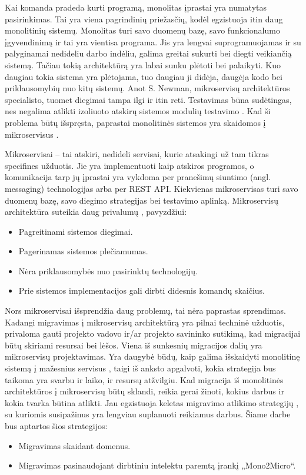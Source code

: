 \documentclass{VUMIFPSbakalaurinis}
\begin{document}
\tableofcontents

Kai komanda pradeda kurti programą, monolitas įprastai yra numatytas pasirinkimas. Tai yra viena pagrindinių priežasčių, kodėl egzistuoja itin daug monolitinių sistemų. Monolitas turi savo duomenų bazę, savo funkcionalumo įgyvendinimą ir tai yra vientisa programa. Jis yra lengvai suprogramuojamas ir su palyginamai nedideliu darbo indėliu, galima greitai sukurti bei diegti veikiančią sistemą. Tačiau tokią architektūrą yra labai sunku plėtoti bei palaikyti. Kuo daugiau  tokia sistema yra plėtojama, tuo daugiau ji didėja, daugėja kodo bei priklausomybių nuo kitų sistemų. Anot S. Newman, mikroservisų architektūros specialisto, tuomet diegimai tampa ilgi ir itin reti. Testavimas būna sudėtingas, nes negalima atlikti izoliuoto atskirų sistemos modulių testavimo \cite{New19}. Kad ši problema būtų išspręsta, paprastai monolitinės sistemos yra skaidomos į mikroservisus \cite{DK}.

Mikroservisai – tai atskiri, nedideli servisai, kurie atsakingi už tam tikras specifines užduotis. Jie yra implementuoti kaip atskiros programos, o komunikacija tarp jų įprastai yra vykdoma per pranešimų siuntimo (angl. messaging) technologijas arba per REST API. Kiekvienas mikroservisas turi savo duomenų bazę, savo diegimo strategijas bei testavimo aplinką. Mikroservisų architektūra suteikia daug privalumų \cite{FBZ+19}, pavyzdžiui:
\begin{itemize}
    \item Pagreitinami sistemos diegimai.
    \item Pagerinamas sistemos plečiamumas.
    \item Nėra priklausomybės nuo pasirinktų technologijų.
    \item Prie sistemos implementacijos gali dirbti didesnis komandų skaičius.
\end{itemize}

Nors mikroservisai išsprendžia daug problemų, tai nėra paprastas sprendimas. Kadangi migravimas į mikroservisų architektūrą yra pilnai techninė užduotis, privaloma gauti projekto vadovo ir/ar projekto savininko sutikimą, kad migracijai būtų skiriami resursai bei lėšos. Viena iš sunkesnių migracijos dalių yra mikroservisų projektavimas. Yra daugybė būdų, kaip galima išskaidyti monolitinę sistemą į mažesnius servisus \cite{FBZ+19}, taigi iš anksto apgalvoti, kokia strategija bus taikoma yra svarbu ir laiko, ir resursų atžvilgiu. Kad migracija iš monolitinės architektūros į mikroservisų būtų sklandi, reikia gerai žinoti, kokius darbus ir kokia tvarka būtina atlikti. Jau egzistuoja keletas migravimo atlikimo strategijų \cite{Wal22,MQO18,KXL+20}, su kuriomis susipažinus yra lengviau suplanuoti reikiamus darbus. Šiame darbe bus aptartos šios strategijos:
\begin{itemize}
    \item Migravimas skaidant domenus.
    \item Migravimas pasinaudojant dirbtiniu intelektu paremtą įrankį „Mono2Micro“.
\end{itemize}
\end{document}
